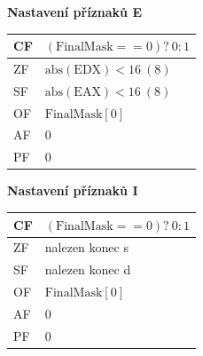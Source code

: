 \documentclass[
]{cz_sablona}
\begin{document}
\noindent
\begin{minipage}[t]{0.48\textwidth}
\centering
\textbf{Nastavení příznaků E}

\vspace{0.5em}
\begin{tabular}{|l|l|}
\hline
CF & $(\mathrm{FinalMask} == 0)?\ 0 : 1$ \\
\hline
ZF & $\mathrm{abs}(\mathrm{EDX}) < 16\ (8)$ \\
\hline
SF & $\mathrm{abs}(\mathrm{EAX}) < 16\ (8)$ \\
\hline
OF & $\mathrm{FinalMask}[0]$ \\
\hline
AF & 0 \\
\hline
PF & 0 \\
\hline
\end{tabular}
\end{minipage}
\hfill
\begin{minipage}[t]{0.48\textwidth}
\centering
\textbf{Nastavení příznaků I}

\vspace{0.5em}
\begin{tabular}{|l|l|}
\hline
CF & $(\mathrm{FinalMask} == 0)?\ 0 : 1$ \\
\hline
ZF & nalezen konec s \\
\hline
SF & nalezen konec d \\
\hline
OF & $\mathrm{FinalMask}[0]$ \\
\hline
AF & 0 \\
\hline
PF & 0 \\
\hline
\end{tabular}
\end{minipage}
\end{document}
